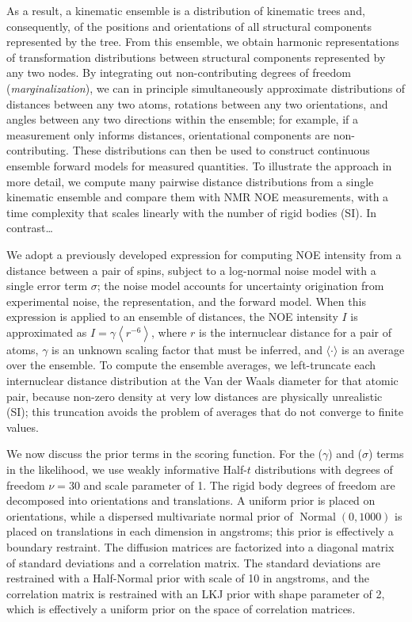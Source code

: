 \documentclass[../main.tex]{subfiles}
\begin{document}
\begin{refsection}
As a result, a kinematic ensemble is a distribution of kinematic trees and, consequently, of the positions and orientations of all structural components represented by the tree.
From this ensemble, we obtain harmonic representations of transformation distributions between structural components represented by any two nodes.
By integrating out non-contributing degrees of freedom (\emph{marginalization}), we can in principle simultaneously approximate distributions of distances between any two atoms, rotations between any two orientations, and angles between any two directions within the ensemble;
for example, if a measurement only informs distances, orientational components are non-contributing.
These distributions can then be used to construct continuous ensemble forward models for measured quantities.
To illustrate the approach in more detail, we compute many pairwise distance distributions from a single kinematic ensemble and compare them with NMR NOE measurements, with a time complexity that scales linearly with the number of rigid bodies (SI).
In contrast\ldots{} 

We adopt a previously developed expression  for computing NOE intensity from a distance between a pair of spins, subject to a log-normal noise model \cite{rieping_inferential_2005} with a single error term $\sigma$; the noise model accounts for uncertainty origination from experimental noise, the representation, and the forward model.
When this expression is applied to an ensemble of distances, the NOE intensity $I$ is approximated as $I = \gamma \left\langle r^{-6} \right\rangle$, where $r$ is the internuclear distance for a pair of atoms, $\gamma$ is an unknown scaling factor that must be inferred, and $\langle \cdot \rangle$ is an average over the ensemble.
To compute the ensemble averages, we left-truncate each internuclear distance distribution at the Van der Waals diameter for that atomic pair, because non-zero density at very low distances are physically unrealistic (SI);
this truncation avoids the problem of averages that do not converge to finite values.

We now discuss the prior terms in the scoring function.
For the ($\gamma$) and ($\sigma$) terms in the likelihood, we use weakly informative Half-$t$ distributions with degrees of freedom $\nu=30$ and scale parameter of 1.
The rigid body degrees of freedom are decomposed into orientations and translations.
A uniform prior is placed on orientations, while a dispersed multivariate normal prior of $\operatorname{Normal}(0, 1000)$ is placed on translations in each dimension in angstroms; this prior is effectively a boundary restraint.
The diffusion matrices are factorized into a diagonal matrix of standard deviations and a correlation matrix.
The standard deviations are restrained with a Half-Normal prior with scale of 10 in angstroms, and the correlation matrix is restrained with an LKJ prior with shape parameter of 2, which is effectively a uniform prior on the space of correlation matrices.


\end{refsection}
\end{document}
